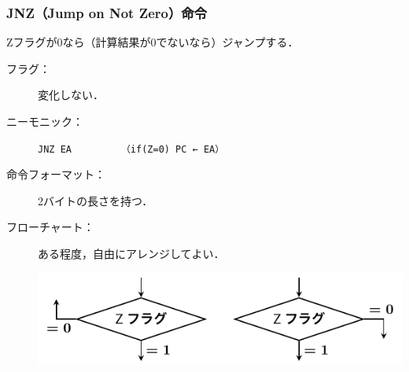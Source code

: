 \documentclass{beamer}                 %
\begin{document}
\begin{frame}
  \frametitle{JNZ（Jump on Not Zero）命令}
  Zフラグが0なら（計算結果が0でないなら）ジャンプする．
  \vfill
  \begin{description}
  \item[フラグ：] 変化しない．
    \vfill

  \item[ニーモニック：]\texttt{JNZ EA}~~~~~~~~~\texttt{（if(Z=0) PC ← EA）}
    \vfill

  \item[命令フォーマット：] 2バイトの長さを持つ．\\
    \vfill

  \item[フローチャート：] ある程度，自由にアレンジしてよい．\\
    \centerline{\includegraphics[scale=0.7]{../Tikz/jnz.pdf}}
  \end{description}
  \vfill
\end{frame}
\end{document}
